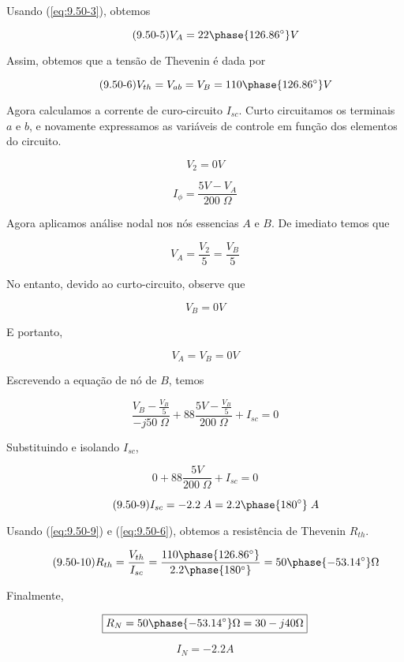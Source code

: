 Usando (\ref{eq:9.50-3}), obtemos

\begin{equation}\label{eq:9.50-5}\tag{9.50-5}
    V_{A} = 22\phase{126.86^{\circ}} V
\end{equation}

Assim, obtemos que a tensão de Thevenin é dada por

\begin{equation}\label{eq:9.50-6}\tag{9.50-6}
    V_{th} = V_{ab} = V_B = 110\phase{126.86^{\circ}} V
\end{equation}

Agora calculamos a corrente de curo-circuito \( I_{sc}\). 
Curto circuitamos os terminais \( a \) e \( b \), e novamente expressamos as variáveis de controle em função dos elementos
do circuito.

\begin{equation}\label{eq:9.50-7}\tag{9.50-7}
    V_{2} = 0 V
\end{equation}

\begin{equation}\label{eq:9.50-8}\tag{9.50-8}
    I_{\phi} = \frac{5V - V_A}{200 \;\Omega}
\end{equation}

Agora aplicamos análise nodal nos nós essencias \(A\) e \( B \).
De imediato temos que

\[ V_{A} = \frac{V_2}{5} = \frac{V_B}{5} \]

No entanto, devido ao curto-circuito, observe que 

\[ V_B = 0V \]

E portanto,

\[ V_A = V_B = 0V \]

Escrevendo a equação de nó de \(B\), temos

\[ \frac{V_B - \frac{V_B}{5}}{-j50 \;\Omega} + 88\frac{5V - \frac{V_B}{5}}{200 \;\Omega} + I_{sc} = 0 \]

Substituindo e isolando  \(I_{sc}\),

\[ 0 + 88\frac{5V}{200 \;\Omega} + I_{sc} = 0 \]

\begin{equation}\label{eq:9.50-9}\tag{9.50-9}
    I_{sc} = - 2.2 \; A = 2.2\phase{180^{\circ}} \; A
\end{equation}

Usando (\ref{eq:9.50-9}) e (\ref{eq:9.50-6}), obtemos a resistência de Thevenin \( R_{th} \).

\begin{equation}\label{eq:9.50-10}\tag{9.50-10}
    R_{th} = \frac{V_{th}}{I_{sc}} = \frac{110\phase{126.86^{\circ}}}{2.2\phase{180^{\circ}}} = 50\phase{-53.14^{\circ}} \Omega
\end{equation}

Finalmente,

\[ \boxed{R_{N} = 50\phase{-53.14^{\circ}} \Omega = 30 - j40 \Omega}  \]

\[ \boxed{I_{N} = - 2.2 A}  \]









